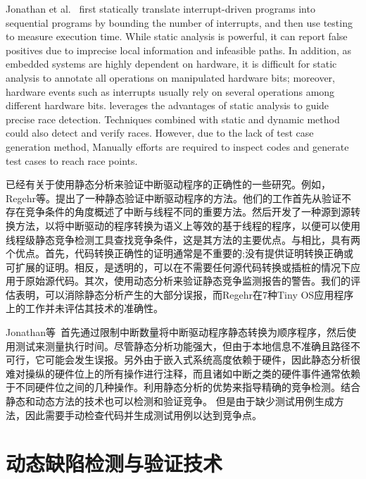 Jonathan et al.~\cite{fmcad11} first statically 
translate interrupt-driven programs into sequential 
programs by bounding the number of interrupts, 
and  then use testing to measure execution time. 
While static analysis is powerful, it can
report false positives due to imprecise local
information and infeasible paths. In addition, as embedded
systems are highly dependent on hardware, it is
difficult for static analysis to annotate all
operations on manipulated hardware bits; moreover,
hardware events such as interrupts usually rely on
several operations among different hardware bits.
\Name{} leverages the advantages of static analysis
to guide precise race detection. 
Techniques combined with static and dynamic method \cite{wang2015detecting}
could also detect and verify races. However, due to the lack of test case generation
method, Manually efforts are required to inspect codes and generate test cases
to reach race points.

已经有关于使用静态分析来验证中断驱动程序的正确性的一些研究\cite{wei2011static, chen2011static, regehr2007interrupt, fmcad11}。例如，Regehr等。\cite{regehr2007interrupt}提出了一种静态验证中断驱动程序的方法。他们的工作首先从验证不存在竞争条件的角度概述了中断与线程不同的重要方法。然后开发了一种源到源转换方法，以将中断驱动的程序转换为语义上等效的基于线程的程序，以便可以使用线程级静态竞争检测工具查找竞争条件，这是其方法的主要优点。与\cite{regehr2007interrupt}相比，\Name{}具有两个优点。首先，代码转换正确性的证明通常是不重要的;\cite{regehr2007interrupt}没有提供证明转换正确或可扩展的证明。相反，\Name{}是透明的，可以在不需要任何源代码转换或插桩的情况下应用于原始源代码。其次，\Name{}使用动态分析来验证静态竞争监测报告的警告。我们的评估表明，\Name{}可以消除静态分析产生的大部分误报，而Regehr在7种Tiny OS应用程序上的工作\cite{regehr2007interrupt}并未评估其技术的准确性。

Jonathan等~\cite{fmcad11}首先通过限制中断数量将中断驱动程序静态转换为顺序程序，然后使用测试来测量执行时间。尽管静态分析功能强大，但由于本地信息不准确且路径不可行，它可能会发生误报。另外由于嵌入式系统高度依赖于硬件，因此静态分析很难对操纵的硬件位上的所有操作进行注释，而且诸如中断之类的硬件事件通常依赖于不同硬件位之间的几种操作。\Name{}利用静态分析的优势来指导精确的竞争检测。结合静态和动态方法的技术\cite{wang2015detecting}也可以检测和验证竞争。 但是由于缺少测试用例生成方法，因此需要手动检查代码并生成测试用例以达到竞争点。

\section{动态缺陷检测与验证技术}\label{sec:related:dyn}
